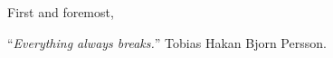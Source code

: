 \documentclass[
11pt, %
english, %
singlespacing, %
headsepline, %
]{MastersDoctoralThesis} %
\begin{document}
\begin{acknowledgements}
\addchaptertocentry{\acknowledgementname} %
\vspace{0.8cm}
First and foremost, 
\end{acknowledgements}




\newpage
\vspace*{0.4\textheight}
\begin{center}
	\noindent\enquote{\itshape Everything always breaks.}\bigbreak
	Tobias Hakan Bjorn Persson.
\end{center}



\tableofcontents %

\listoffigures %

\listoftables %


\end{document}
